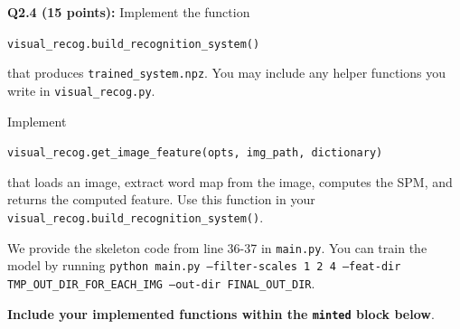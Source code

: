 \documentclass[11pt]{article}
\makeatletter
\numberwithin{equation}{section} %
\numberwithin{figure}{section} %
\numberwithin{table}{section} %
\DeclareRobustCommand\onedot{\futurelet\@let@token\@onedot}
\def\@onedot{\ifx\@let@token.\else.\null\fi\xspace}
\def\eg{\emph{e.g}\onedot} \def\Eg{\emph{E.g}\onedot}
\makeatother
\begin{document}
\par \noindent
{\bf Q2.4 (15 points):}
Implement the function
\begin{center}
{\tt visual\_recog.build\_recognition\_system()} 
\end{center}
that produces {\tt trained\_system.npz}. You may include any helper functions you write in {\tt visual\_recog.py}.

Implement 
\begin{center}
{\tt visual\_recog.get\_image\_feature(opts, img\_path, dictionary)} 
\end{center}
that loads an image, extract word map from the image, computes the SPM, and returns the computed feature. Use this function in your {\tt visual\_recog.build\_recognition\_system()}.

We provide the skeleton code from line 36-37 in {\tt main.py}. You can train the model by running {\tt python main.py --filter-scales 1 2 4 --feat-dir TMP\_OUT\_DIR\_FOR\_EACH\_IMG --out-dir FINAL\_OUT\_DIR}.

\textbf{Include your implemented functions  within the \texttt{minted} block below}.




\end{document}
